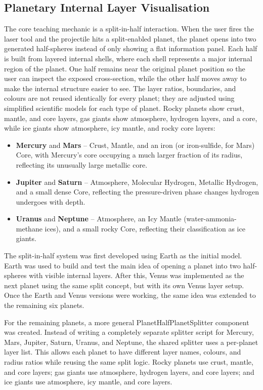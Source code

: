 \documentclass[journal]{vgtc}
\begin{document}
\subsection{Planetary Internal Layer Visualisation}
\label{sec:layers}
The core teaching mechanic is a split-in-half interaction. When the user fires the laser tool and the projectile hits a split-enabled planet, the planet opens into two generated half-spheres instead of only showing a flat information panel. Each half is built from layered internal shells, where each shell represents a major internal region of the planet. One half remains near the original planet position so the user can inspect the exposed cross-section, while the other half moves away to make the internal structure easier to see. The layer ratios, boundaries, and colours are not reused identically for every planet; they are adjusted using simplified scientific models for each type of planet. Rocky planets show crust, mantle, and core layers, gas giants show atmosphere, hydrogen layers, and a core, while ice giants show atmosphere, icy mantle, and rocky core layers:

\begin{itemize}
\item \textbf{Mercury} and \textbf{Mars} -- Crust, Mantle, and an iron (or iron-sulfide, for Mars) Core, with Mercury's core occupying a much larger fraction of its radius, reflecting its unusually large metallic core.
\item \textbf{Jupiter} and \textbf{Saturn} -- Atmosphere, Molecular Hydrogen, Metallic Hydrogen, and a small dense Core, reflecting the pressure-driven phase changes hydrogen undergoes with depth.
\item \textbf{Uranus} and \textbf{Neptune} -- Atmosphere, an Icy Mantle (water-ammonia-methane ices), and a small rocky Core, reflecting their classification as ice giants.
\end{itemize}

The split-in-half system was first developed using Earth as the initial model. Earth was used to build and test the main idea of opening a planet into two half-spheres with visible internal layers. After this, Venus was implemented as the next planet using the same split concept, but with its own Venus layer setup. Once the Earth and Venus versions were working, the same idea was extended to the remaining six planets.

For the remaining planets, a more general PlanetHalfPlanetSplitter component was created. Instead of writing a completely separate splitter script for Mercury, Mars, Jupiter, Saturn, Uranus, and Neptune, the shared splitter uses a per-planet layer list. This allows each planet to have different layer names, colours, and radius ratios while reusing the same split logic. Rocky planets use crust, mantle, and core layers; gas giants use atmosphere, hydrogen layers, and core layers; and ice giants use atmosphere, icy mantle, and core layers.
\end{document}
